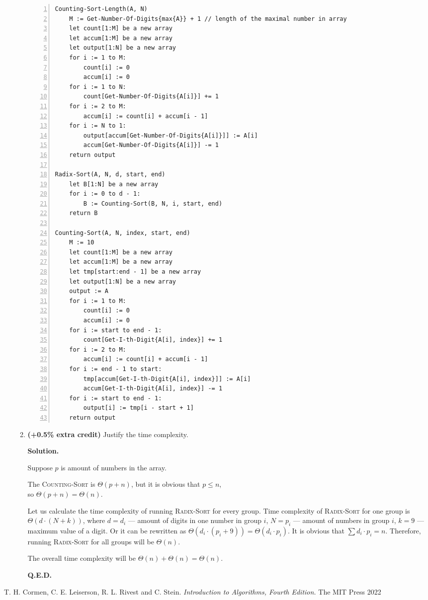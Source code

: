 \documentclass{article}
\begin{document}
\begin{enumerate}
\begin{enumerate}
\begin{lstlisting}[numbers=left,language={},style=pseudo,mathescape=true,firstnumber=1]
Counting-Sort-Length(A, N)
    M := Get-Number-Of-Digits{max{A}} + 1 // length of the maximal number in array
    let count[1:M] be a new array
    let accum[1:M] be a new array
    let output[1:N] be a new array
    for i := 1 to M:
        count[i] := 0
        accum[i] := 0
    for i := 1 to N:
        count[Get-Number-Of-Digits{A[i]}] += 1
    for i := 2 to M:
        accum[i] := count[i] + accum[i - 1]
    for i := N to 1:
        output[accum[Get-Number-Of-Digits{A[i]}]] := A[i]
        accum[Get-Number-Of-Digits{A[i]}] -= 1
    return output

Radix-Sort(A, N, d, start, end)
    let B[1:N] be a new array
    for i := 0 to d - 1:
        B := Counting-Sort(B, N, i, start, end)
    return B

Counting-Sort(A, N, index, start, end)
    M := 10
    let count[1:M] be a new array
    let accum[1:M] be a new array
    let tmp[start:end - 1] be a new array
    let output[1:N] be a new array
    output := A
    for i := 1 to M:
        count[i] := 0
        accum[i] := 0
    for i := start to end - 1:
        count[Get-I-th-Digit{A[i], index}] += 1
    for i := 2 to M:
        accum[i] := count[i] + accum[i - 1]
    for i := end - 1 to start:
        tmp[accum[Get-I-th-Digit{A[i], index}]] := A[i]
        accum[Get-I-th-Digit{A[i], index}] -= 1
    for i := start to end - 1:
        output[i] := tmp[i - start + 1]
    return output
\end{lstlisting}
        
        \item \textbf{(+0.5\% extra credit)} Justify the time complexity.

        \textbf{Solution.}

        Suppose $p$ is amount of numbers in the array.

        The \textsc{Counting-Sort} is $\Theta(p + n)$, but it is obvious that $p \leq n$,\\
        so $\Theta(p + n) = \Theta(n)$.

        Let us calculate the time complexity of running \textsc{Radix-Sort} for every group. Time complexity of \textsc{Radix-Sort} for one group is $\Theta(d \cdot (N + k))$, where $d = d_i$ --- amount of digits in one number in group $i$, $N = p_i$ --- amount of numbers in group $i$, $k = 9$ --- maximum value of a digit. Or it can be rewritten as $\Theta(d_i \cdot (p_i + 9)) = \Theta(d_i \cdot p_i)$. It is obvious that $\sum{d_i \cdot p_i} = n$. Therefore, running \textsc{Radix-Sort} for all groups will be $\Theta(n)$.

        The overall time complexity will be $\Theta(n) + \Theta(n) = \Theta(n)$.

        \textbf{Q.E.D.}
        
    \end{enumerate}

\end{enumerate}

\begin{thebibliography}{9}
  T. H. Cormen, C. E. Leiserson, R. L. Rivest and C. Stein.
  \textit{Introduction to Algorithms, Fourth Edition.}
  The MIT Press
  2022
\end{thebibliography}
\end{document}
